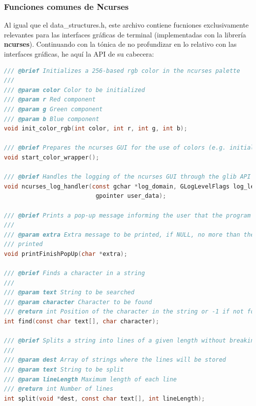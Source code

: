 \documentclass[a4paper,12pt]{article}
\begin{document}
\subsubsection{Funciones comunes de Ncurses}
Al igual que el data\_structures.h, este archivo contiene fucniones exclusivamente relevantes para las interfaces gráficas de terminal
(implementadas con la librería \textbf{ncurses}). Continuando con la tónica de no profundizar en lo relativo con las interfaces gráficas,
he aquí la API de su cabecera:
\begin{lstlisting}[language=C]
/// @brief Initializes a 256-based rgb color in the ncurses palette
///
/// @param color Color to be initialized
/// @param r Red component
/// @param g Green component
/// @param b Blue component
void init_color_rgb(int color, int r, int g, int b);

/// @brief Prepares the ncurses GUI for the use of colors (e.g. initializing the palette)
void start_color_wrapper();

/// @brief Handles the logging of the ncurses GUI through the glib API
void ncurses_log_handler(const gchar *log_domain, GLogLevelFlags log_level, const gchar *message,
                          gpointer user_data);

/// @brief Prints a pop-up message informing the user that the program is exiting
///
/// @param extra Extra message to be printed, if NULL, no more than the default message will be
/// printed
void printFinishPopUp(char *extra);

/// @brief Finds a character in a string
///
/// @param text String to be searched
/// @param character Character to be found
/// @return int Position of the character in the string or -1 if not found
int find(const char text[], char character);

/// @brief Splits a string into lines of a given length without breaking words
///
/// @param dest Array of strings where the lines will be stored
/// @param text String to be split
/// @param lineLength Maximum length of each line
/// @return int Number of lines
int split(void *dest, const char text[], int lineLength);
\end{lstlisting}
\end{document}

